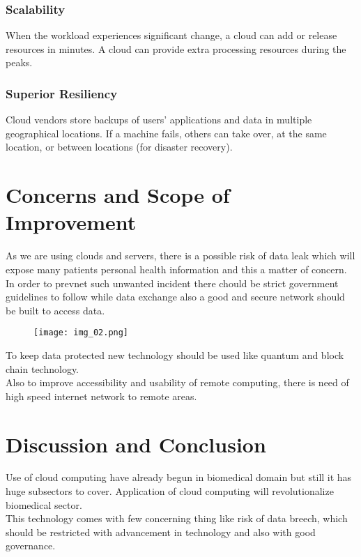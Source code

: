 \documentclass[12pt]{article}
\begin{document}
	\subsubsection{Scalability}
	When the workload experiences significant change, a cloud can
	add or release resources in minutes. A cloud can provide extra processing resources during the peaks.
	\\
	\subsubsection{Superior Resiliency}
	Cloud vendors store backups of users’ applications and data in
	multiple geographical locations. If a machine fails, others can take
	over, at the same location, or between locations (for disaster
	recovery).
	\\
	\clearpage
	\section{Concerns and Scope of Improvement}
	As we are using clouds and servers, there is a possible risk of data leak which will expose many patients personal health information and this a matter of concern. In order to prevnet such unwanted incident there chould be strict government guidelines to follow while data exchange also a good and secure network should be built to access data.
	\\
	\vspace{4.5mm}
	\begin{figure}[h]
		\begin{center}
			\texttt{[image: img\_02.png]}
		\end{center}
	\end{figure}
	
	To keep data protected new technology should be used like quantum and block chain technology.
	\\
	Also to improve accessibility and usability of remote computing, there is need of high speed internet network to remote areas.
	\\
	\section{Discussion and Conclusion}
	Use of cloud computing have already begun in biomedical domain but still it has huge subsectors to cover. Application of cloud computing will revolutionalize biomedical sector. 
	\\
	This technology comes with few concerning thing like risk of data breech, which should be restricted with advancement in technology and also with good governance.
	\\
	\newpage
\end{document}
